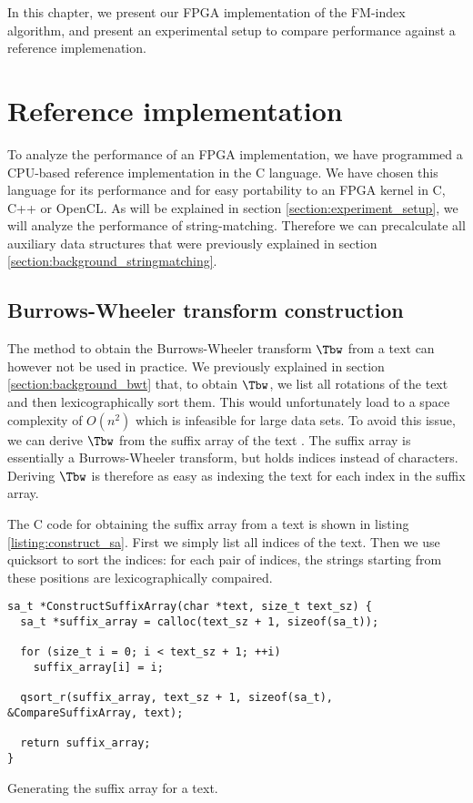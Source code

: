 In this chapter, we present our FPGA implementation of the FM-index algorithm, and present an experimental setup to compare performance against a reference implemenation.

\section{Reference implementation} \label{section:ref_impl}

To analyze the performance of an FPGA implementation, we have programmed a CPU-based reference implementation in the C language.
We have chosen this language for its performance and for easy portability to an FPGA kernel in C, C++ or OpenCL.
As will be explained in section \ref{section:experiment_setup}, we will analyze the performance of string-matching.
Therefore we can precalculate all auxiliary data structures that were previously explained in section \ref{section:background_stringmatching}.

\subsection{Burrows-Wheeler transform construction} \label{section:bwt_construction}

The method to obtain the Burrows-Wheeler transform $\Tbw$ from a text can however not be used in practice.
We previously explained in section \ref{section:background_bwt} that, to obtain $\Tbw$, we list all rotations of the text and then lexicographically sort them.
This would unfortunately load to a space complexity of $O(n^2)$ which is infeasible for large data sets.
To avoid this issue, we can derive $\Tbw$ from the suffix array of the text \cite{ullah_implementation_2020}.
The suffix array is essentially a Burrows-Wheeler transform, but holds indices instead of characters.
Deriving $\Tbw$ is therefore as easy as indexing the text for each index in the suffix array.

The C code for obtaining the suffix array from a text is shown in listing \ref{listing:construct_sa}.
First we simply list all indices of the text.
Then we use quicksort to sort the indices: for each pair of indices, the strings starting from these positions are lexicographically compaired.

\begin{listing}[ht]
\begin{verbatim}
sa_t *ConstructSuffixArray(char *text, size_t text_sz) {
  sa_t *suffix_array = calloc(text_sz + 1, sizeof(sa_t));

  for (size_t i = 0; i < text_sz + 1; ++i)
    suffix_array[i] = i;

  qsort_r(suffix_array, text_sz + 1, sizeof(sa_t), &CompareSuffixArray, text);

  return suffix_array;
}
\end{verbatim}
\caption{Generating the suffix array for a text.}
\label{listing:construct_sa}
\end{listing}


